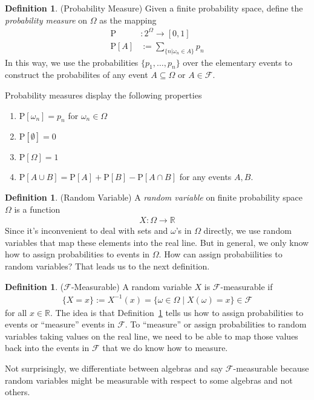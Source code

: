 \documentclass[12pt]{article}
\theoremstyle{plain}
\theoremstyle{definition}
\newtheorem{defn}[thm]{Definition}
\theoremstyle{remark}
\newcommand{\Prb}{\mathrm{P}}
\newcommand{\ra}{\rightarrow}
\newcommand{\calF}{\mathcal{F}}
\newcommand{\R}{\mathbb{R}}
\begin{document}
\begin{defn}{(Probability Measure)}
\label{defn:finitemeasure}
Given a finite probability space, define the \emph{probability measure}
on $\Omega$ as the mapping
\begin{align*}
  \Prb&: 2^\Omega \rightarrow [0,1] \\
  \Prb[A] &:= \sum_{\{n|\omega_n\in A\}} p_n
\end{align*}
In this way, we use the probabilities $\{p_1,\ldots,p_n\}$ over the
elementary events to construct the probabilites of any event
$A\subseteq \Omega$ or $A\in\calF$.

Probability measures display the following properties
\begin{enumerate}
  \item $\Prb[\omega_n]=p_n$ for $\omega_n\in\Omega$
  \item $\Prb[\emptyset] = 0$
  \item $\Prb[\Omega] = 1$
  \item $\Prb[A\cup B] = \Prb[A] + \Prb[B] - \Prb[A\cap B]$ for any
    events $A,B$.
\end{enumerate}
\end{defn}


\begin{defn}{(Random Variable)}
A \emph{random variable} on finite probability space $\Omega$ is a
function
\begin{align*}
  X: \Omega\ra \R
\end{align*}
Since it's inconvenient to deal with sets and $\omega$'s in $\Omega$
directly, we use random variables that map these elements into the real
line. But in general, we only know how to assign probabilities to
events in $\Omega$. How can assign probabiilities to random variables?
That leads us to the next definition.
\end{defn}

\begin{defn}{($\calF$-Measurable)}
A random variable $X$ is $\calF$-measurable if
\begin{align*}
  \{X=x\} :=
  X^{-1}(x) =
  \{\omega\in\Omega \; | \; X(\omega)=x\}
  \in \calF
\end{align*}
for all $x\in\R$. The idea is that Definition~\ref{defn:finitemeasure}
tells us how to assign probabilities to events or ``measure'' events in
$\calF$. To ``measure'' or assign probabilities to random variables
taking values on the real line, we need to be able to map those values
back into the events in $\calF$ that we do know how to measure.

Not surprisingly, we differentiate between algebras and say
$\calF$-measurable because random variables might be measurable with
respect to some algebras and not others.
\end{defn}
\end{document}
